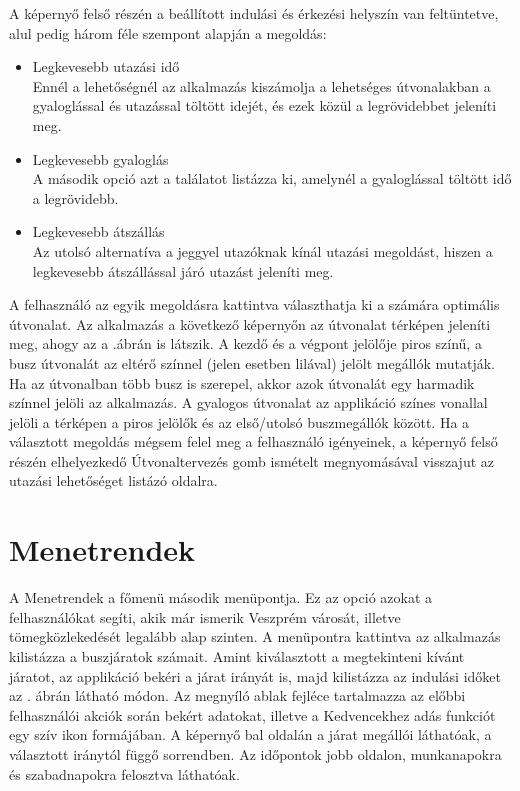 A képernyő felső részén a beállított indulási és érkezési helyszín van feltüntetve, alul pedig három féle szempont alapján a megoldás:
\begin{itemize}
	\item Legkevesebb utazási idő
	\\Ennél a lehetőségnél az alkalmazás kiszámolja a lehetséges útvonalakban a gyaloglással és utazással töltött idejét, és ezek közül a legrövidebbet jeleníti meg.
	\item Legkevesebb gyaloglás
	\\A második opció azt a találatot listázza ki, amelynél a gyaloglással töltött idő a legrövidebb.
	\item Legkevesebb átszállás
	\\Az utolsó alternatíva a jeggyel utazóknak kínál utazási megoldást, hiszen a legkevesebb átszállással járó utazást jeleníti meg.
\end{itemize}
A felhasználó az egyik megoldásra kattintva választhatja ki a számára optimális útvonalat.
Az alkalmazás a következő képernyőn az útvonalat térképen jeleníti meg, ahogy az a .ábrán is látszik.
A kezdő és a végpont jelölője piros színű, a busz útvonalát az eltérő színnel (jelen esetben lilával) jelölt megállók mutatják.
Ha az útvonalban több busz is szerepel, akkor azok útvonalát egy harmadik színnel jelöli az alkalmazás.
A gyalogos útvonalat az applikáció színes vonallal jelöli a térképen a piros jelölők és az első/utolsó buszmegállók között.
Ha a választott megoldás mégsem felel meg a felhasználó igényeinek, a képernyő felső részén elhelyezkedő Útvonaltervezés gomb ismételt megnyomásával visszajut az utazási lehetőséget listázó oldalra.
\section {Menetrendek}
\label {menetrendek}
A Menetrendek a főmenü második menüpontja.
Ez az opció azokat a felhasználókat segíti, akik már ismerik Veszprém városát, illetve tömegközlekedését legalább alap szinten.
A menüpontra kattintva az alkalmazás kilistázza a buszjáratok számait.
Amint kiválasztott a megtekinteni kívánt járatot, az applikáció bekéri a járat irányát is, majd kilistázza az indulási időket az . ábrán látható módon.
Az megnyíló ablak fejléce tartalmazza az előbbi felhasználói akciók során bekért adatokat, illetve a Kedvencekhez adás funkciót egy szív ikon formájában.
A képernyő bal oldalán a járat megállói láthatóak, a választott iránytól függő sorrendben.
Az időpontok jobb oldalon, munkanapokra és szabadnapokra felosztva láthatóak.

